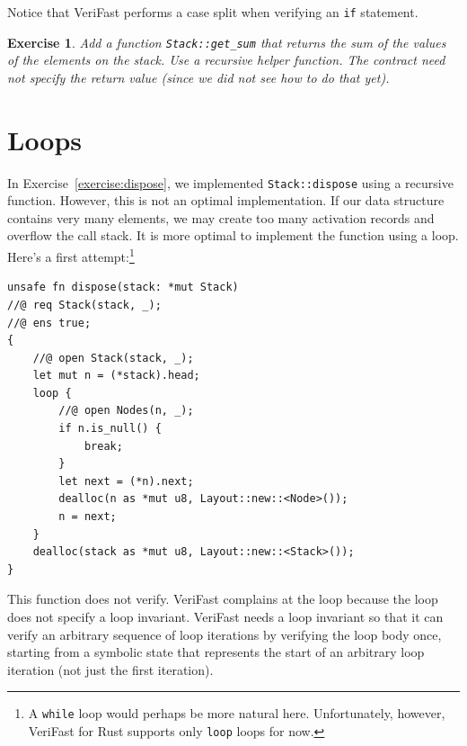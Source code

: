 \documentclass{article}
\newtheorem{exercise}{Exercise}
\begin{document}
Notice that VeriFast performs a case split when verifying an
\lstinline!if! statement.

\begin{exercise}\label{exercise:sum}
Add a function \lstinline!Stack::get_sum! that returns the sum
of the values of the elements on the stack. Use a recursive
helper function. The contract need not specify the return value
(since we did not see how to do that yet).
\end{exercise}

\section{Loops}\label{section:loops}

In Exercise~\ref{exercise:dispose}, we implemented
\lstinline!Stack::dispose! using a recursive function. However,
this is not an optimal implementation. If our data structure
contains very many elements, we may create too many activation
records and overflow the call stack. It is more optimal to
implement the function using a loop. Here's a first attempt:\footnote{A \lstinline|while| loop would perhaps be more natural here. Unfortunately, however, VeriFast for Rust supports only \lstinline|loop| loops for now.}
\begin{lstlisting}
unsafe fn dispose(stack: *mut Stack)
//@ req Stack(stack, _);
//@ ens true;
{
    //@ open Stack(stack, _);
    let mut n = (*stack).head;
    loop {
        //@ open Nodes(n, _);
        if n.is_null() {
            break;
        }
        let next = (*n).next;
        dealloc(n as *mut u8, Layout::new::<Node>());
        n = next;
    }
    dealloc(stack as *mut u8, Layout::new::<Stack>());
}
\end{lstlisting}
This function does not verify. VeriFast complains at the loop
because the loop does not specify a loop invariant. VeriFast
needs a loop invariant so that it can verify an arbitrary
sequence of loop iterations by verifying the loop body once,
starting from a symbolic state that represents the start of an
arbitrary loop iteration (not just the first iteration).
\end{document}
